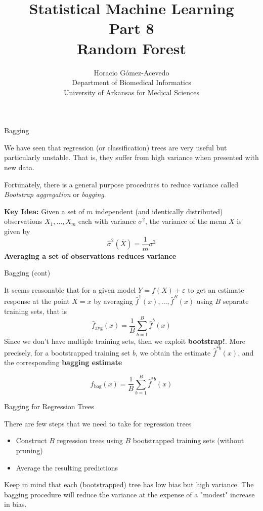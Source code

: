 \documentclass{beamer}
\title{Statistical Machine Learning\\ Part 8\\ Random Forest}
\author{Horacio G\'omez-Acevedo\\ Department of Biomedical Informatics\\
University of Arkansas for Medical Sciences}
\begin{document}
	\begin{frame}[plain]
		\maketitle
	\end{frame}
	\begin{frame}{Bagging}
		
		We have seen that regression (or classification) trees are very useful but particularly unstable. That is, they suffer from high variance when presented with new data. 
		
		Fortunately, there is a general purpose procedures to reduce variance called {\it Bootstrap aggregation} or {\it bagging}. 
		
		{\bf Key Idea:} Given a set of $m$ independent (and identically distributed)  observations $X_1,\ldots, X_m$ each with variance $\sigma^2$, the variance of the mean $\overline{X}$ is given by 
		\begin{equation*}
			\hat{\sigma}^2(\overline{X})= \frac{1}{m} \sigma^2
		\end{equation*}
		{\bf Averaging a set of observations reduces variance}
		
	\end{frame}

\begin{frame}{Bagging (cont)}
	
	It seems reasonable that for a given model $Y=f(X)+\varepsilon$ to get an estimate response at the point $X=x$ by averaging $\hat{f}^1(x), \ldots, \hat{f}^B(x)$ using $B$ separate training sets, that is 
	\begin{equation*}
		\hat{f}_{\textrm{avg}}(x)= \frac{1}{B} \sum_{b=1}^B \hat{f}^b (x)
	\end{equation*}
Since we don't have multiple training sets, then we exploit {\bf bootstrap!}.  More precisely, for a bootstrapped training set $b$, we obtain the estimate $\hat{f}^{*b}(x)$, and the corresponding {\bf bagging estimate}

	\begin{equation*}
	\hat{f}_{\textrm{bag}}(x)= \frac{1}{B} \sum_{b=1}^B \hat{f}^{*b} (x)
\end{equation*}

\end{frame}
	
	
	



\begin{frame}{Bagging for Regression Trees}
	
	There are few steps that we need to take for regression trees
	\begin{itemize}
		\item Construct $B$ regression trees using $B$ bootstrapped training sets (without pruning)
		\item Average the resulting predictions
	\end{itemize}
Keep in mind that each (bootstrapped) tree has low bias but high variance. The bagging procedure will reduce the variance at the expense of a "modest" increase in bias. 
\end{frame}
\end{document}
